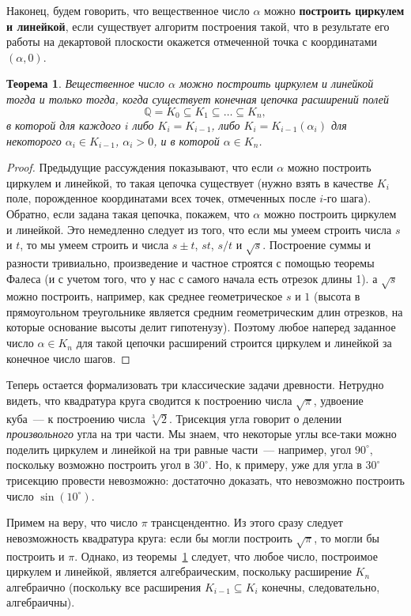 \documentclass[a4paper,11pt]{scrartcl}
\theoremstyle{plain}
\newtheorem{theorem}{Теорема}[subsection]
\theoremstyle{definition}
\newcommand\dfn[1]{\textbf{#1}}
\newcommand\mb{\mathbb}
\newcommand\sseq{\subseteq}
\begin{document}
Наконец, будем говорить, что вещественное число $\alpha$ можно
\dfn{построить циркулем и линейкой}, если существует алгоритм
построения такой, что в результате его работы на декартовой плоскости
окажется отмеченной точка с координатами $(\alpha,0)$.
\begin{theorem}\label{thm_construct}
Вещественное число $\alpha$ можно построить циркулем и линейкой тогда
и только тогда, когда существует конечная цепочка расширений полей
$$
\mb Q=K_0\sseq K_1\sseq\dots\sseq K_n,
$$
в которой для каждого $i$ либо $K_i=K_{i-1}$, либо
$K_i=K_{i-1}(\alpha_i)$ для некоторого $\alpha_i\in K_{i-1}$,
$\alpha_i>0$, и в которой $\alpha\in K_n$.
\end{theorem}
\begin{proof}
Предыдущие рассуждения показывают, что если $\alpha$ можно построить
циркулем и линейкой, то такая цепочка существует (нужно взять в
качестве $K_i$ поле, порожденное координатами всех точек, отмеченных
после $i$-го шага). Обратно, если задана такая цепочка, покажем, что
$\alpha$ можно построить циркулем и линейкой. Это немедленно следует
из того, что если мы умеем строить числа $s$ и $t$, то мы умеем
строить и числа $s\pm t$, $st$, $s/t$ и $\sqrt{s}$. Построение суммы и
разности тривиально, произведение и частное строятся с помощью теоремы
Фалеса (и с учетом того, что у нас с самого начала есть отрезок длины
1). а $\sqrt{s}$ можно построить, например, как среднее геометрическое
$s$ и $1$ (высота в прямоугольном треугольнике является средним
геометрическим длин отрезков, на которые основание высоты делит
гипотенузу). Поэтому любое наперед заданное число $\alpha\in K_n$ для
такой цепочки расширений строится циркулем и линейкой за конечное
число шагов.
\end{proof}

Теперь остается формализовать три классические задачи
древности. Нетрудно
видеть, что квадратура круга сводится к построению числа $\sqrt{\pi}$,
удвоение куба~--- к построению числа $\sqrt[3]{2}$. Трисекция угла
говорит о делении \emph{произвольного} угла на три части. Мы знаем, что
некоторые углы все-таки можно поделить циркулем и линейкой на три
равные части~--- например, угол $90^\circ$, поскольку возможно
построить угол в $30^\circ$. Но, к примеру, уже для угла в $30^\circ$
трисекцию провести невозможно: достаточно доказать, что невозможно
построить число $\sin(10^\circ)$.

Примем на веру, что число $\pi$ трансцендентно. Из этого сразу следует
невозможность квадратура круга: если бы могли построить $\sqrt{\pi}$,
то могли бы построить и $\pi$. Однако, из теоремы~\ref{thm_construct}
следует, что любое
число, построимое циркулем и линейкой, является алгебраическим,
поскольку расширение $K_n$ алгебраично (поскольку все расширения
$K_{i-1}\sseq K_i$ конечны, следовательно, алгебраичны).
\end{document}
